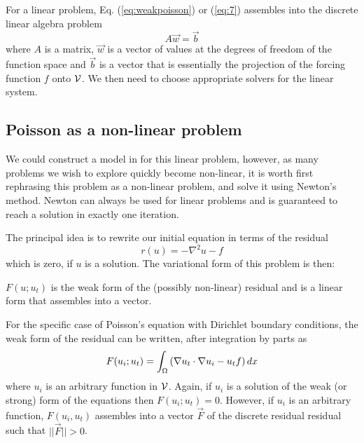 For a linear problem, Eq. (\ref{eq:weakpoisson}) or (\ref{eq:7})
assembles into the discrete linear algebra problem
\begin{equation}
  \label{eq:1}
  A\vec{w} = \vec{b}
\end{equation}
where $A$ is a matrix, $\vec{w}$ is a vector of values at the degrees
of freedom of the function space and $\vec{b}$ is a vector that is essentially the
projection of the forcing function $f$ onto $\mathcal{V}$.  We then need
to choose appropriate solvers for the linear system.

\subsection{Poisson as a non-linear problem}
\label{sec:poisson-as-non}

We could construct a model in \TF{} for this linear problem, however, as many
problems we wish to explore  quickly become non-linear, it is worth
first rephrasing this problem as a non-linear problem, and solve it
using Newton's method.  Newton can always be used for linear problems
and is guaranteed to reach a solution in exactly one iteration. %

The principal idea is to rewrite our initial equation in terms of the residual
\begin{equation}
  \label{eq:2}
  r(u) = -\nabla^2 u - f
\end{equation}
which is zero, if $u$ is a solution.  The variational form of this
problem  is then:
\begin{quote}
\end{quote} 
$F(u;u_{t})$ is the weak form of the (possibly non-linear) residual
and is a linear form that assembles into a vector.

For the specific case of Poisson's equation with Dirichlet boundary conditions,
the weak form of the residual can be written, after integration by
parts as
\begin{equation}
  \label{eq:4}
  F(u_{i};u_{t}) = \int_{\Omega}
  \left(
    \nabla u_{t}\cdot\nabla u_{i} - u_{t}f
  \right)dx
\end{equation}
where $u_{i}$ is an arbitrary function in $\mathcal{V}$.   Again, if
$u_{i}$ is a solution of the weak (or strong) form of the equations
then $F(u_{i};u_{t})=0$.  However, if  $u_{i}$ is an arbitrary
function, $F(u_{i},u_{t})$ assembles into a vector $\vec{F}$ of the
discrete residual residual such that $||\vec{F}||>0$.  


